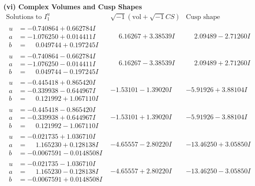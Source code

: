 \documentclass[1p]{elsarticle_modified}
\theoremstyle{definition}
\newcommand{\I}{\sqrt{-1}}
\begin{document}
\newpage\flushleft \textbf{(vi) Complex Volumes and Cusp Shapes}
$$\begin{array}{c|c|c}  
\text{Solutions to }I^u_{1}& \I (\text{vol} + \sqrt{-1}CS) & \text{Cusp shape}\\
 \hline 
\begin{aligned}
u &= -0.740864 + 0.662784 I \\
a &= -1.076250 + 0.014411 I \\
b &= \phantom{-}0.049744 + 0.197245 I\end{aligned}
 & \phantom{-}6.16267 + 3.38539 I & \phantom{-}2.09489 - 2.71260 I \\ \hline\begin{aligned}
u &= -0.740864 - 0.662784 I \\
a &= -1.076250 - 0.014411 I \\
b &= \phantom{-}0.049744 - 0.197245 I\end{aligned}
 & \phantom{-}6.16267 - 3.38539 I & \phantom{-}2.09489 + 2.71260 I \\ \hline\begin{aligned}
u &= -0.445418 + 0.865420 I \\
a &= -0.339938 - 0.644967 I \\
b &= \phantom{-}0.121992 + 1.067110 I\end{aligned}
 & -1.53101 - 1.39020 I & -5.91926 + 3.88104 I \\ \hline\begin{aligned}
u &= -0.445418 - 0.865420 I \\
a &= -0.339938 + 0.644967 I \\
b &= \phantom{-}0.121992 - 1.067110 I\end{aligned}
 & -1.53101 + 1.39020 I & -5.91926 - 3.88104 I \\ \hline\begin{aligned}
u &= -0.021735 + 1.036710 I \\
a &= \phantom{-}1.165230 + 0.128138 I \\
b &= -0.0067591 - 0.0148508 I\end{aligned}
 & -4.65557 - 2.80220 I & -13.46250 + 3.05850 I \\ \hline\begin{aligned}
u &= -0.021735 - 1.036710 I \\
a &= \phantom{-}1.165230 - 0.128138 I \\
b &= -0.0067591 + 0.0148508 I\end{aligned}
 & -4.65557 + 2.80220 I & -13.46250 - 3.05850 I \\ \hline\begin{aligned}

\end{aligned}
\end{array}$$
\end{document}
